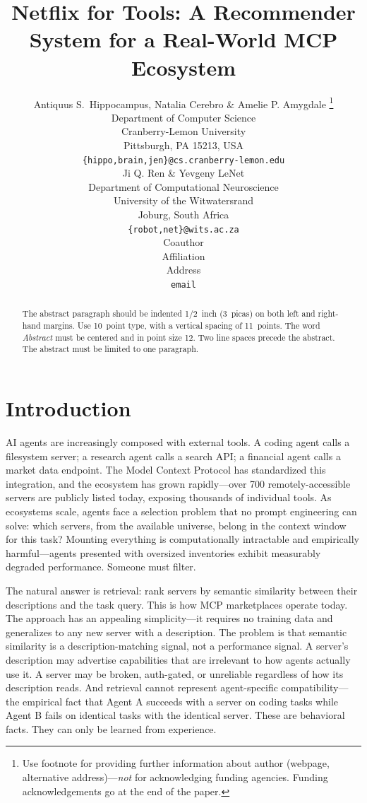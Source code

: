 \documentclass{article} %
\title{Netflix for Tools: A Recommender System for a Real-World MCP Ecosystem}
\author{Antiquus S.~Hippocampus, Natalia Cerebro \& Amelie P. Amygdale \thanks{ Use footnote for providing further information
about author (webpage, alternative address)---\emph{not} for acknowledging
funding agencies.  Funding acknowledgements go at the end of the paper.} \\
Department of Computer Science\\
Cranberry-Lemon University\\
Pittsburgh, PA 15213, USA \\
\texttt{\{hippo,brain,jen\}@cs.cranberry-lemon.edu} \\
\And
Ji Q. Ren \& Yevgeny LeNet \\
Department of Computational Neuroscience \\
University of the Witwatersrand \\
Joburg, South Africa \\
\texttt{\{robot,net\}@wits.ac.za} \\
\AND
Coauthor \\
Affiliation \\
Address \\
\texttt{email}
}
\begin{document}
\ifcolmsubmission
\linenumbers
\fi

\maketitle

\begin{abstract}
The abstract paragraph should be indented 1/2~inch (3~picas) on both left and
right-hand margins. Use 10~point type, with a vertical spacing of 11~points.
The word \textit{Abstract} must be centered and in point size 12. Two
line spaces precede the abstract. The abstract must be limited to one
paragraph.
\end{abstract}

\section{Introduction}
\label{sec:intro}

AI agents are increasingly composed with external tools. A coding agent calls a filesystem server; a research agent calls a search API; a financial agent calls a market data endpoint. The Model Context Protocol has standardized this integration, and the ecosystem has grown rapidly---over 700 remotely-accessible servers are publicly listed today, exposing thousands of individual tools. As ecosystems scale, agents face a selection problem that no prompt engineering can solve: which servers, from the available universe, belong in the context window for this task? Mounting everything is computationally intractable and empirically harmful---agents presented with oversized inventories exhibit measurably degraded performance. Someone must filter.

The natural answer is retrieval: rank servers by semantic similarity between their descriptions and the task query. This is how MCP marketplaces operate today. The approach has an appealing simplicity---it requires no training data and generalizes to any new server with a description. The problem is that semantic similarity is a description-matching signal, not a performance signal. A server's description may advertise capabilities that are irrelevant to how agents actually use it. A server may be broken, auth-gated, or unreliable regardless of how its description reads. And retrieval cannot represent agent-specific compatibility---the empirical fact that Agent A succeeds with a server on coding tasks while Agent B fails on identical tasks with the identical server. These are behavioral facts. They can only be learned from experience.
\end{document}
